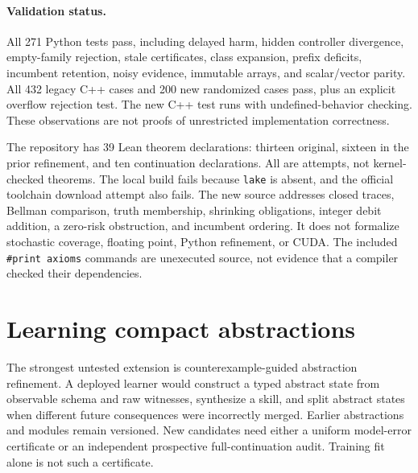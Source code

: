 \documentclass[10pt,twocolumn]{article}
\begin{document}
\paragraph{Validation status.}
All 271 Python tests pass, including delayed harm, hidden controller divergence,
empty-family rejection, stale certificates, class expansion, prefix deficits,
incumbent retention, noisy evidence, immutable arrays, and scalar/vector parity.
All 432 legacy C++ cases and 200 new randomized cases pass, plus an explicit
overflow rejection test. The new C++ test runs with undefined-behavior checking.
These observations are not proofs of unrestricted implementation correctness.

The repository has 39 Lean theorem declarations: thirteen original, sixteen in
the prior refinement, and ten continuation declarations. All are attempts, not
kernel-checked theorems. The local build fails because \texttt{lake} is absent,
and the official toolchain download attempt also fails. The new source addresses
closed traces, Bellman comparison, truth membership, shrinking obligations,
integer debit addition, a zero-risk obstruction, and incumbent ordering. It does
not formalize stochastic coverage, floating point, Python refinement, or CUDA.
The included \texttt{\#print axioms} commands are unexecuted source, not evidence
that a compiler checked their dependencies.

\section{Learning compact abstractions}
The strongest untested extension is counterexample-guided abstraction refinement.
A deployed learner would construct a typed abstract state from observable schema
and raw witnesses, synthesize a skill, and split abstract states when different
future consequences were incorrectly merged. Earlier abstractions and modules
remain versioned. New candidates need either a uniform model-error certificate
or an independent prospective full-continuation audit. Training fit alone is not
such a certificate.
\end{document}
